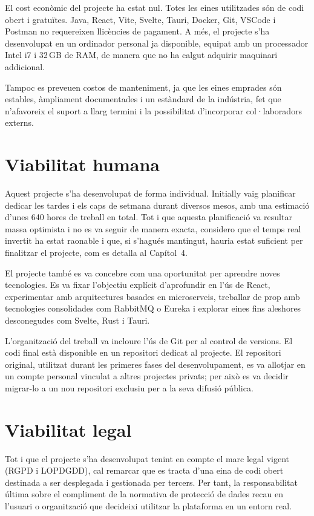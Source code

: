 El cost econòmic del projecte ha estat nul. Totes les eines utilitzades són de codi obert i gratuïtes. Java, React, Vite, Svelte, Tauri, Docker, Git, VSCode i Postman no requereixen llicències de pagament. A més, el projecte s'ha desenvolupat en un ordinador personal ja disponible, equipat amb un processador Intel i7 i 32\,GB de RAM, de manera que no ha calgut adquirir maquinari addicional.

Tampoc es preveuen costos de manteniment, ja que les eines emprades són estables, àmpliament documentades i un estàndard de la indústria, fet que n'afavoreix el suport a llarg termini i la possibilitat d'incorporar col·laboradors externs.

\section{Viabilitat humana}

Aquest projecte s'ha desenvolupat de forma individual. Initially vaig planificar dedicar les tardes i els caps de setmana durant diversos mesos, amb una estimació d'unes 640 hores de treball en total. Tot i que aquesta planificació va resultar massa optimista i no es va seguir de manera exacta, considero que el temps real invertit ha estat raonable i que, si s'hagués mantingut, hauria estat suficient per finalitzar el projecte, com es detalla al Capítol~4.

El projecte també es va concebre com una oportunitat per aprendre noves tecnologies. Es va fixar l'objectiu explícit d'aprofundir en l'ús de React, experimentar amb arquitectures basades en microserveis, treballar de prop amb tecnologies consolidades com RabbitMQ o Eureka i explorar eines fins aleshores desconegudes com Svelte, Rust i Tauri.

L'organització del treball va incloure l'ús de Git per al control de versions. El codi final està disponible en un repositori dedicat al projecte. El repositori original, utilitzat durant les primeres fases del desenvolupament, es va allotjar en un compte personal vinculat a altres projectes privats; per això es va decidir migrar-lo a un nou repositori exclusiu per a la seva difusió pública.

\section{Viabilitat legal}

Tot i que el projecte s'ha desenvolupat tenint en compte el marc legal vigent (RGPD i LOPDGDD), cal remarcar que es tracta d'una eina de codi obert destinada a ser desplegada i gestionada per tercers. Per tant, la responsabilitat última sobre el compliment de la normativa de protecció de dades recau en l'usuari o organització que decideixi utilitzar la plataforma en un entorn real.

